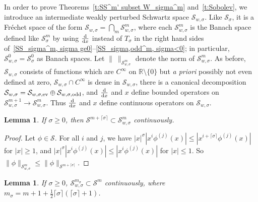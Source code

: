\documentclass[pdftex]{sigma}
\newtheorem{Lemma}[Theorem]{Lemma}
\newcommand{\R}{\mathbb{R}}
\renewcommand{\SS}{\mathcal{S}}
\newcommand{\Cinf}{C^\infty}
\begin{document}
In order to prove Theorems~\ref{t:SS^m' subset W_sigma^m} and~\ref{t:Sobolev}, we introduce an intermediate
weakly perturbed Schwartz space $\SS_{w,\sigma}$. Like $\SS_\sigma$, it is a Fr\'echet space of the form $\SS_{w,\sigma}=\bigcap_m\SS_{w,\sigma}^m$, where each $\SS_{w,\sigma}^m$ is the Banach space def\/ined like $\SS_\sigma^m$ by using  $\frac{{\rm d}}{{\rm d}x}$ instead of $T_\sigma$ in the right hand sides of~\mbox{\eqref{SS_sigma^m, sigma ge0}--\eqref{SS_sigma,odd^m, sigma<0}}; in particular, $\SS_{w,\sigma}^0=\SS_\sigma^0$ as Banach spaces. Let $\|\ \|_{\SS_{w,\sigma}^m}$ denote the norm of $\SS_{w,\sigma}^m$. As before, $\SS_{w,\sigma}$ consists of functions which are $\Cinf$ on $\R\setminus\{0\}$ but \textit{a priori} possibly not even def\/ined at zero, $\SS_{w,\sigma}\cap\Cinf$ is dense in $\SS_{w,\sigma}$, there is a canonical decomposition $\SS_{w,\sigma}=\SS_{w,\sigma,\text{\rm ev}}\oplus\SS_{w,\sigma,\text{\rm odd}}$, and $\frac{{\rm d}}{{\rm d}x}$ and $x$ def\/ine bounded operators on $\SS_{w,\sigma}^{m+1}\to\SS_{w,\sigma}^m$. Thus  $\frac{{\rm d}}{{\rm d}x}$ and $x$ def\/ine continuous operators on $\SS_{w,\sigma}$.

\begin{Lemma}\label{l:SS m+lceil sigma/2 rceil subset SS w,sigma m}
  If $\sigma\ge0$, then $\SS^{m+\lceil\sigma\rceil}\subset\SS_{w,\sigma}^m$ continuously.
\end{Lemma}

\begin{proof}
  Let $\phi\in\SS$. For all $i$ and $j$, we have $|x|^\sigma|x^i\phi^{(j)}(x)|\le|x^{i+\lceil\sigma\rceil}\phi^{(j)}(x)|$ for $|x|\ge1$, and $|x|^\sigma|x^i\phi^{(j)}(x)|\le|x^i\phi^{(j)}(x)|$ for $|x|\le1$. So $\|\phi\|_{\SS_{w,\sigma}^m}\le\|\phi\|_{\SS^{m+\lceil\sigma\rceil}}$.
\end{proof}

\begin{Lemma}\label{l:SS_w,sigma^m' subset SS^m}
  If $\sigma\ge0$, $\SS_{w,\sigma}^{m_\sigma}\subset\SS^m$ continuously, where $m_\sigma=m+1+\frac{1}{2}\lceil\sigma\rceil(\lceil\sigma\rceil+1)$.
\end{Lemma}
\end{document}
